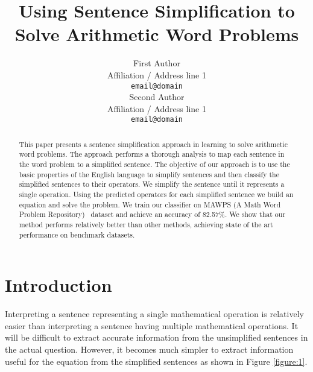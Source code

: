 \documentclass[11pt]{article}
\begin{document}
\title{Using Sentence Simplification to Solve Arithmetic Word Problems}

\author{First Author \\
  Affiliation / Address line 1 \\
  {\tt email@domain} \\\And
  Second Author \\
  Affiliation / Address line 1 \\
  {\tt email@domain} \\}

\date{}
\maketitle

\begin{abstract}
This paper presents a sentence simplification approach in learning to solve arithmetic word problems. The approach performs a thorough analysis to map each sentence in the word problem to a simplified sentence. The objective of our approach is to use the basic properties of the English language to simplify sentences and then classify the simplified sentences to their operators. We simplify the sentence until it represents a single operation. Using the predicted operators for each simplified sentence we build an equation and solve the problem. We train our classifier on MAWPS (A Math Word Problem Repository)~\cite{MAWPS} dataset and achieve an accuracy of 82.57\%. We show that our method performs relatively better than other methods, achieving state of the art performance on benchmark datasets.
\end{abstract}

\section{Introduction}
Interpreting a sentence representing a single mathematical operation is relatively easier than interpreting a sentence having multiple mathematical operations. It will be difficult to extract accurate information from the unsimplified sentences in the actual question. However, it becomes much simpler to extract information useful for the equation from the simplified sentences as shown in Figure \ref{figure:1}.
\end{document}
